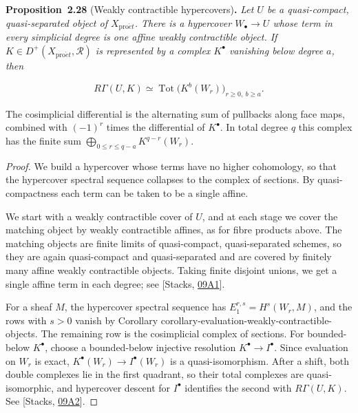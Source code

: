 \documentclass[11pt]{article}
\newenvironment{bpstatement}[2]{\par\addvspace{0.6\baselineskip}\noindent\textbf{#1}#2\textbf{.}\enspace\ignorespaces}
  {\par\addvspace{0.4\baselineskip}}
\newenvironment{bpstatementit}[2]{\begin{bpstatement}{#1}{#2}\itshape\ignorespaces}{\end{bpstatement}}
\begin{document}
\label{bp81}%
\begin{bpstatementit}{Proposition~2.28}{ (Weakly contractible hypercovers)}
Let \(U\) be a quasi-compact, quasi-separated object of \(X_{\mathrm{pro}\acute{e}t}\). There is a hypercover \(W_\bullet\to U\) whose term in every simplicial degree is one affine weakly contractible object. If \(K\in D^+(X_{\mathrm{pro}\acute{e}t},\mathcal R)\) is represented by a complex \(K^\bullet\) vanishing below degree \(a\), then

\[
R\Gamma(U,K)
\simeq \operatorname{Tot}\bigl(K^b(W_r)\bigr)_{r\geq0,\ b\geq a}.
\tag{2.3}
\]

The cosimplicial differential is the alternating sum of pullbacks along face maps, combined with \((-1)^r\) times the differential of \(K^\bullet\). In total degree \(q\) this complex has the finite sum \(\bigoplus_{0\leq r\leq q-a}K^{q-r}(W_r)\).
\end{bpstatementit}

\begin{proof}[{Proof}]\label{bp82}%
We build a hypercover whose terms have no higher cohomology, so that the hypercover spectral sequence collapses to the complex of sections. By quasi-compactness each term can be taken to be a single affine.

We start with a weakly contractible cover of \(U\), and at each stage we cover the matching object by weakly contractible affines, as for fibre products above. The matching objects are finite limits of quasi-compact, quasi-separated schemes, so they are again quasi-compact and quasi-separated and are covered by finitely many affine weakly contractible objects. Taking finite disjoint unions, we get a single affine term in each degree; see [Stacks, \href{https://stacks.math.columbia.edu/tag/09A1}{09A1}].

For a sheaf \(M\), the hypercover spectral sequence has \(E_1^{r,s}=H^s(W_r,M)\), and the rows with \(s>0\) vanish by Corollary corollary-evaluation-weakly-contractible-objects. The remaining row is the cosimplicial complex of sections. For bounded-below \(K^\bullet\), choose a bounded-below injective resolution \(K^\bullet\to I^\bullet\). Since evaluation on \(W_r\) is exact, \(K^\bullet(W_r)\to I^\bullet(W_r)\) is a quasi-isomorphism. After a shift, both double complexes lie in the first quadrant, so their total complexes are quasi-isomorphic, and hypercover descent for \(I^\bullet\) identifies the second with \(R\Gamma(U,K)\). See [Stacks, \href{https://stacks.math.columbia.edu/tag/09A2}{09A2}].
\end{proof}
\end{document}
